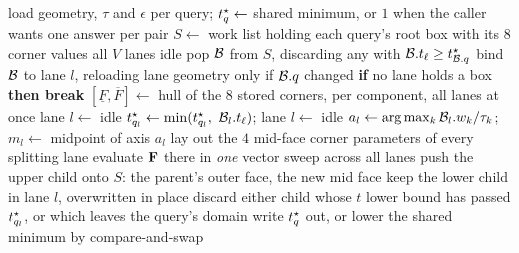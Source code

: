 \begin{algorithm}[!tb]
\caption{Host narrow phase. Lanes hold boxes from different queries, which
\cref{prop:order} permits. $V$ is the vector width and $D$ the depth cap.}
\label{alg:host}
\footnotesize
\begin{algorithmic}[1]
    \State load geometry, $\tau$ and $\epsilon$ per query;\;
           $t^{\star}_{q} \gets$ shared minimum, or $1$ when the caller wants one
           answer per pair
    \State $S \gets$ work list holding each query's root box with its $8$
           corner values
    \State all $V$ lanes idle
        \State pop $\mathcal{B}$ from $S$, discarding any with
               $\mathcal{B}.t_{\ell} \ge t^{\star}_{\mathcal{B}.q}$
        \State bind $\mathcal{B}$ to lane $l$, reloading lane geometry only if
               $\mathcal{B}.q$ changed
      \EndFor
      \State \textbf{if} no lane holds a box \textbf{then break}
      \State $[\underline{F},\overline{F}] \gets$ hull of the $8$ stored
             corners, per component, all lanes at once
          \State lane $l \gets$ idle
          \State $\toi_{q_{l}} \gets \min(\toi_{q_{l}},\ \dom_{l}.t_{\ell})$;\;
                 lane $l \gets$ idle
        \Else
          \State $a_{l} \gets \arg\max_{k} \mathcal{B}_{l}.w_{k}/\tau_{k}$;\;
                 $m_{l} \gets$ midpoint of axis $a_{l}$
        \EndIf
      \EndFor
      \State lay out the $4$ mid-face corner parameters of every splitting lane
      \State evaluate $\mathbf{F}$ there in \emph{one} vector sweep across all lanes
        \State push the upper child onto $S$: the parent's outer face, the new
               mid face
        \State keep the lower child in lane $l$, overwritten in place
        \State discard either child whose $t$ lower bound has passed
               $t^{\star}_{q_{l}}$, or which leaves the query's domain
      \EndFor
    \EndWhile
    \State write $t^{\star}_{q}$ out, or lower the shared minimum by
           compare-and-swap
  \EndFor
\EndFunction
\end{algorithmic}
\end{algorithm}


